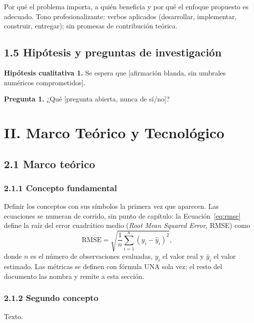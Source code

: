 \documentclass[12pt,letterpaper]{report}
\begin{document}
Por qué el problema importa, a quién beneficia y por qué el enfoque propuesto es adecuado. Tono profesionalizante: verbos aplicados (desarrollar, implementar, construir, entregar); sin promesas de contribución teórica.

\section{1.5 Hipótesis y preguntas de investigación}

\textbf{Hipótesis cualitativa 1.} Se espera que [afirmación blanda, sin umbrales numéricos comprometidos].

\textbf{Pregunta 1.} ¿Qué [pregunta abierta, nunca de sí/no]?

\chapter{II. Marco Teórico y Tecnológico}

\section{2.1 Marco teórico}

\subsection{2.1.1 Concepto fundamental}

Definir los conceptos con sus símbolos la primera vez que aparecen. Las ecuaciones se numeran de corrido, sin punto de capítulo: la Ecuación~\eqref{eq:rmse} define la raíz del error cuadrático medio (\textit{Root Mean Squared Error}, RMSE) como
\begin{equation}
    \text{RMSE} = \sqrt{\frac{1}{n}\sum_{i=1}^{n} \left( y_i - \hat{y}_i \right)^2},
    \label{eq:rmse}
\end{equation}
donde $n$ es el número de observaciones evaluadas, $y_i$ el valor real y $\hat{y}_i$ el valor estimado. Las métricas se definen con fórmula UNA sola vez; el resto del documento las nombra y remite a esta sección.

\subsection{2.1.2 Segundo concepto}

Texto.
\end{document}
